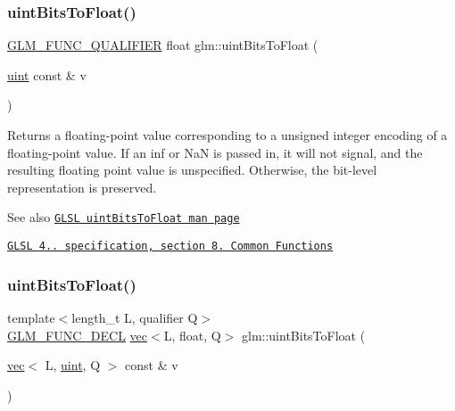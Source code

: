 \subsubsection{\texorpdfstring{uint\+Bits\+To\+Float()}{uintBitsToFloat()}\hspace{0.1cm}{\footnotesize\ttfamily [1/2]}}
{\footnotesize\ttfamily \hyperlink{setup_8hpp_a33fdea6f91c5f834105f7415e2a64407}{G\+L\+M\+\_\+\+F\+U\+N\+C\+\_\+\+Q\+U\+A\+L\+I\+F\+I\+ER} float glm\+::uint\+Bits\+To\+Float (\begin{DoxyParamCaption}\item[{\hyperlink{group__core__precision_ga4fd29415871152bfb5abd588334147c8}{uint} const \&}]{v }\end{DoxyParamCaption})}

Returns a floating-\/point value corresponding to a unsigned integer encoding of a floating-\/point value. If an inf or NaN is passed in, it will not signal, and the resulting floating point value is unspecified. Otherwise, the bit-\/level representation is preserved.

\begin{DoxySeeAlso}{See also}
\href{http://www.opengl.org/sdk/docs/manglsl/xhtml/uintBitsToFloat.xml}{\tt G\+L\+SL uint\+Bits\+To\+Float man page} 

\href{http://www.opengl.org/registry/doc/GLSLangSpec.4.20.8.pdf}{\tt G\+L\+SL 4.. specification, section 8. Common Functions} 
\end{DoxySeeAlso}
\mbox{\label{group__core__func__common_ga97f46b5f7b42fe44482e13356eb394ae}} 
\subsubsection{\texorpdfstring{uint\+Bits\+To\+Float()}{uintBitsToFloat()}\hspace{0.1cm}{\footnotesize\ttfamily [2/2]}}
{\footnotesize\ttfamily template$<$length\+\_\+t L, qualifier Q$>$ \\
\hyperlink{setup_8hpp_ab2d052de21a70539923e9bcbf6e83a51}{G\+L\+M\+\_\+\+F\+U\+N\+C\+\_\+\+D\+E\+CL} \hyperlink{structglm_1_1vec}{vec}$<$L, float, Q$>$ glm\+::uint\+Bits\+To\+Float (\begin{DoxyParamCaption}\item[{\hyperlink{structglm_1_1vec}{vec}$<$ L, \hyperlink{group__core__precision_ga4fd29415871152bfb5abd588334147c8}{uint}, Q $>$ const \&}]{v }\end{DoxyParamCaption})}

